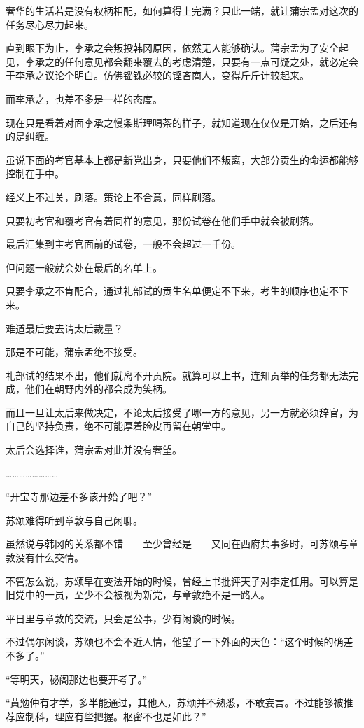 奢华的生活若是没有权柄相配，如何算得上完满？只此一端，就让蒲宗孟对这次的任务尽心尽力起来。

直到眼下为止，李承之会叛投韩冈原因，依然无人能够确认。蒲宗孟为了安全起见，李承之的任何意见都会翻来覆去的考虑清楚，只要有一点可疑之处，就必定会于李承之议论个明白。仿佛锱铢必较的铿吝商人，变得斤斤计较起来。

而李承之，也差不多是一样的态度。

现在只是看着对面李承之慢条斯理喝茶的样子，就知道现在仅仅是开始，之后还有的是纠缠。

虽说下面的考官基本上都是新党出身，只要他们不叛离，大部分贡生的命运都能够控制在手中。

经义上不过关，刷落。策论上不合意，同样刷落。

只要初考官和覆考官有着同样的意见，那份试卷在他们手中就会被刷落。

最后汇集到主考官面前的试卷，一般不会超过一千份。

但问题一般就会处在最后的名单上。

只要李承之不肯配合，通过礼部试的贡生名单便定不下来，考生的顺序也定不下来。

难道最后要去请太后裁量？

那是不可能，蒲宗孟绝不接受。

礼部试的结果不出，他们就离不开贡院。就算可以上书，连知贡举的任务都无法完成，他们在朝野内外的都会成为笑柄。

而且一旦让太后来做决定，不论太后接受了哪一方的意见，另一方就必须辞官，为自己的坚持负责，绝不可能厚着脸皮再留在朝堂中。

太后会选择谁，蒲宗孟对此并没有奢望。

……………………

“开宝寺那边差不多该开始了吧？”

苏颂难得听到章敦与自己闲聊。

虽然说与韩冈的关系都不错——至少曾经是——又同在西府共事多时，可苏颂与章敦没有什么交情。

不管怎么说，苏颂早在变法开始的时候，曾经上书批评天子对李定任用。可以算是旧党中的一员，至少不会被视为新党，与章敦绝不是一路人。

平日里与章敦的交流，只会是公事，少有闲谈的时候。

不过偶尔闲谈，苏颂也不会不近人情，他望了一下外面的天色：“这个时候的确差不多了。”

“等明天，秘阁那边也要开考了。”

“黄勉仲有才学，多半能通过，其他人，苏颂并不熟悉，不敢妄言。不过能够被推荐应制科，理应有些把握。枢密不也是如此？”

